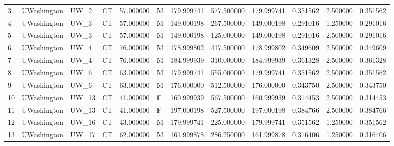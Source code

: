 \begin{tabular}{llllrlrrrrrr}
3      &     UWashington &         UW\_2 &                 CT &  57.000000 &        M &       179.999741 &    577.500000 &  179.999741 &               0.351562 &            2.500000 &          0.351562 \\
4      &     UWashington &         UW\_3 &                 CT &  57.000000 &        M &       149.000198 &    267.500000 &  149.000198 &               0.291016 &            1.250000 &          0.291016 \\
5      &     UWashington &         UW\_3 &                 CT &  57.000000 &        M &       149.000198 &    125.000000 &  149.000198 &               0.291016 &            2.500000 &          0.291016 \\
6      &     UWashington &         UW\_4 &                 CT &  76.000000 &        M &       178.999802 &    417.500000 &  178.999802 &               0.349609 &            2.500000 &          0.349609 \\
7      &     UWashington &         UW\_4 &                 CT &  76.000000 &        M &       184.999939 &    310.000000 &  184.999939 &               0.361328 &            2.500000 &          0.361328 \\
8      &     UWashington &         UW\_6 &                 CT &  63.000000 &        M &       179.999741 &    555.000000 &  179.999741 &               0.351562 &            2.500000 &          0.351562 \\
9      &     UWashington &         UW\_6 &                 CT &  63.000000 &        M &       176.000000 &    512.500000 &  176.000000 &               0.343750 &            2.500000 &          0.343750 \\
10     &     UWashington &        UW\_13 &                 CT &  41.000000 &        F &       160.999939 &    567.500000 &  160.999939 &               0.314453 &            2.500000 &          0.314453 \\
11     &     UWashington &        UW\_13 &                 CT &  41.000000 &        F &       197.000198 &    527.500000 &  197.000198 &               0.384766 &            2.500000 &          0.384766 \\
12     &     UWashington &        UW\_16 &                 CT &  43.000000 &        M &       179.999741 &    225.000000 &  179.999741 &               0.351562 &            1.250000 &          0.351562 \\
13     &     UWashington &        UW\_17 &                 CT &  62.000000 &        M &       161.999878 &    286.250000 &  161.999878 &               0.316406 &            1.250000 &          0.316406 \\

\end{tabular}
